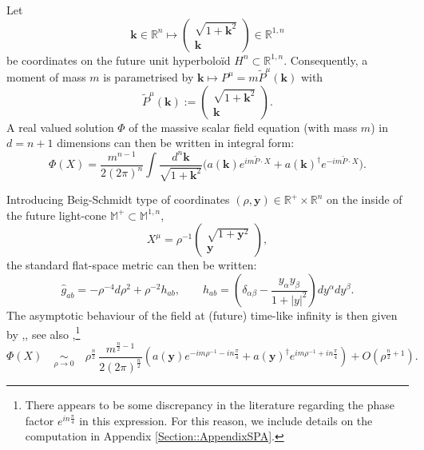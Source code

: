 \documentclass[a4paper, 10pt]{article}
\theoremstyle{remark}
\newcommand{\pg}{\hat{g}}
\newcommand{\y}{\bm{y}}
\newcommand{\scal}{\cdot} %
\begin{document}
Let
\begin{equation}
    \bm{k} \in \mathbb{R}^n \mapsto  \begin{pmatrix}
        \sqrt{1 + \bm{k}^2}\\ \bm{k}
    \end{pmatrix} \in \mathbb{R}^{1,n}
\end{equation}
be coordinates on the future unit hyperboloïd $H^n \subset \mathbb{R}^{1,n}$. Consequently, a moment of mass $m$ is parametrised by $\bm{k} \mapsto P^{\mu} = m \tilde{P}^{\mu}(\bm{k})$ with
\begin{equation}\label{Massive scalar field: P tilde definition}
\tilde{P}^{\mu}(\bm{k}) :=  \begin{pmatrix}
        \sqrt{1 + \bm{k}^2}\\ \bm{k}
    \end{pmatrix}.   
\end{equation}
A real valued solution $\Phi$ of the massive scalar field equation (with mass $m$) in $d=n+1$ dimensions can then be written in integral form:
\begin{equation}\label{Massive scalar field: Fourier coefficients}
    \Phi(X) = \frac{m^{n-1}}{2 (2\pi)^n}\int \frac{d^{n}\bm{k}}{\sqrt{1 + \bm{k}^2}} \Big( a(\bm{k}) e^{i m \tilde{P} \scal X} + a(\bm{k})^{\dagger} e^{-i m \tilde{P} \scal X}\Big).
\end{equation}


Introducing Beig-Schmidt type of coordinates $(\rho, \bm{y})\in \mathbb{R}^+\times \mathbb{R}^{n}$ on the inside of the future light-cone $\mathbb{M}^+ \subset \mathbb{M}^{1,n}$,
\begin{equation}\label{Massive scalar field: BS coordinate}
    X^{\mu} = \rho^{-1} \begin{pmatrix}
        \sqrt{1 + \bm{y}^2}\\ \bm{y}
    \end{pmatrix},
\end{equation}
the standard flat-space metric can then be written:
\begin{equation}\label{Massive field: flat metric expression}
    \pg_{ab} = - \rho^{-4} d \rho^2 + \rho^{-2} h_{ab}, \qquad h_{ab} = \left(\delta_{\alpha\beta} - \frac{y_{\alpha}y_{\beta}}{ 1+ |y|^2}\right) dy^{\alpha}dy^{\beta}.
\end{equation} 
 The asymptotic behaviour of the field at (future) time-like infinity is then given by \cite{JEDP_1987____A1_0},\cite[Chapter 7]{Hormander:1997aa}, see also \cite{Campiglia:2015kxa,Have:2024dff},\footnote{There appears to be some discrepancy in the literature regarding the phase factor $e^{in\frac{\pi}{4}}$ in this expression. For this reason, we include details on the computation in Appendix \ref{Section::AppendixSPA}.}
\begin{equation}
    \Phi(X)   \quad \underset{\rho \to 0}{\sim} \quad  \rho^{\frac{n}{2}}  \, \frac{m^{\frac{n}{2}-1}}{2 (2\pi)^{\frac{n}{2}}} \left( a(\y) e^{-im \rho^{-1}-in\frac{\pi}{4}} + a(\y)^{\dagger} e^{im \rho^{-1}+in\frac{\pi}{4}} \right)  + O(\rho^{\frac{n}{2}+1} ).
    \label{Eq::FallOffScalar}
\end{equation}
\end{document}
